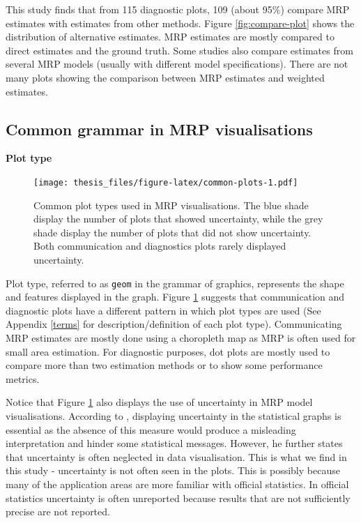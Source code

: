\documentclass{monashthesis}
\begin{document}
This study finds that from 115 diagnostic plots, 109 (about 95\%) compare MRP estimates with estimates from other methods. Figure \ref{fig:compare-plot} shows the distribution of alternative estimates. MRP estimates are mostly compared to direct estimates and the ground truth. Some studies also compare estimates from several MRP models (usually with different model specifications). There are not many plots showing the comparison between MRP estimates and weighted estimates.

\hypertarget{common-grammar-in-mrp-visualisations}{%
\subsection{Common grammar in MRP visualisations}\label{common-grammar-in-mrp-visualisations}}

\textbf{Plot type}

\begin{figure}
\centering
\texttt{[image: thesis\_files/figure-latex/common-plots-1.pdf]}
\caption{\label{fig:common-plots}Common plot types used in MRP visualisations. The blue shade display the number of plots that showed uncertainty, while the grey shade display the number of plots that did not show uncertainty. Both communication and diagnostics plots rarely displayed uncertainty.}
\end{figure}

Plot type, referred to as \texttt{geom} in the grammar of graphics, represents the shape and features displayed in the graph. Figure \ref{fig:common-plots} suggests that communication and diagnostic plots have a different pattern in which plot types are used (See Appendix \ref{terms} for description/definition of each plot type). Communicating MRP estimates are mostly done using a choropleth map as MRP is often used for small area estimation. For diagnostic purposes, dot plots are mostly used to compare more than two estimation methods or to show some performance metrics.

Notice that Figure \ref{fig:common-plots} also displays the use of uncertainty in MRP model visualisations. According to \textcite{MIDWAY2020100141}, displaying uncertainty in the statistical graphs is essential as the absence of this measure would produce a misleading interpretation and hinder some statistical messages. However, he further states that uncertainty is often neglected in data visualisation. This is what we find in this study - uncertainty is not often seen in the plots. This is possibly because many of the application areas are more familiar with official statistics. In official statistics uncertainty is often unreported because results that are not sufficiently precise are not reported.
\end{document}
